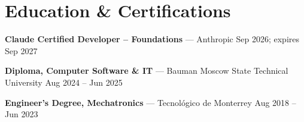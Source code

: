 \section{Education \& Certifications}

\newcommand{\edu}[3]{\noindent\textbf{#1} --- #2 \hfill {\small\color{secondary}#3}\par\vspace{2pt}}

\edu{Claude Certified Developer -- Foundations}{Anthropic}{Sep 2026; expires Sep 2027}
\edu{Diploma, Computer Software \& IT}{Bauman Moscow State Technical University}{Aug 2024 -- Jun 2025}
\edu{Engineer's Degree, Mechatronics}{Tecnológico de Monterrey}{Aug 2018 -- Jun 2023}
